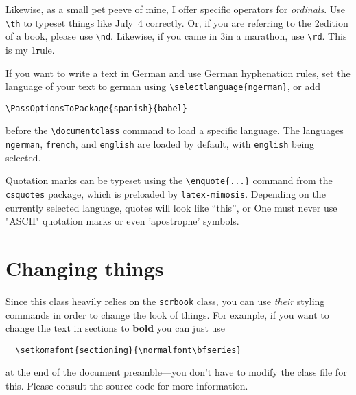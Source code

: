 Likewise, as a small pet peeve of mine, I offer specific operators for
\emph{ordinals}. Use \verb|\th| to typeset things like July~4\th
correctly. Or, if you are referring to the 2\nd edition of a book,
please use \verb|\nd|. Likewise, if you came in 3\rd in a marathon, use
\verb|\rd|. This is my 1\st rule.

If you want to write a text in German and use German hyphenation rules, set the language of your text to german using \verb|\selectlanguage{ngerman}|, or add
\begin{verbatim}
\PassOptionsToPackage{spanish}{babel}
\end{verbatim}
before the \verb|\documentclass| command to load a specific language. The languages \verb|ngerman|, \verb|french|, and \verb|english| are loaded by default, with \verb|english| being selected.

Quotation marks can be typeset using the \verb|\enquote{...}| command from the \verb|csquotes| package, which is preloaded by \verb|latex-mimosis|.
Depending on the currently selected language, quotes will look like \enquote{this},
or
One must never use "ASCII" quotation marks or even 'apostrophe' symbols.

\section{Changing things}

Since this class heavily relies on the \verb|scrbook| class, you can use
\emph{their} styling commands in order to change the look of things. For
example, if you want to change the text in sections to \textbf{bold} you
can just use
%
\begin{verbatim}
  \setkomafont{sectioning}{\normalfont\bfseries}
\end{verbatim}
%
at the end of the document preamble---you don't have to modify the class
file for this. Please consult the source code for more information.
